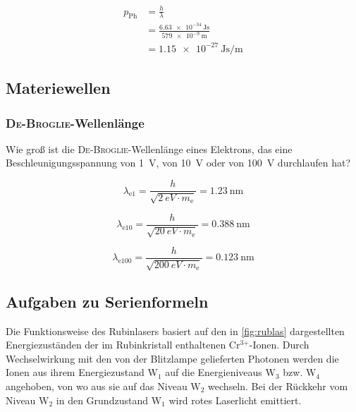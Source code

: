 \documentclass{ajc}
\begin{document}
	\begin{equation}
		\begin{split}
			p_\text{Ph} &= \frac{h}{\lambda} \\
						&= \frac{\SI{6,63e-34}{\J\s}}{\SI{579e-9}{\m}} \\
						&= \SI{1,15e-27}{\J\s\per\m}
		\end{split}
	\end{equation}
	
	\newpage
	
	\subsection{Materiewellen}
	
	\subsubsection{\textsc{D\lowercase{e}-B\lowercase{roglie}}-Wellenlänge}
	Wie groß ist die \textsc{De-Broglie}-Wellenlänge eines Elektrons, das eine Beschleunigungsspannung von \SI{1}{\volt}, von \SI{10}{\volt} oder von \SI{100}{\volt} durchlaufen hat?
	
	\begin{equation}
		\lambda_\text{e1} = \frac{h}{\sqrt{\SI{2}{eV} \cdot m_\text{e}}} = \SI{1,23}{\nm}
	\end{equation}
	
	\begin{equation}
		\lambda_\text{e10} = \frac{h}{\sqrt{\SI{20}{eV} \cdot m_\text{e}}} = \SI{0,388}{\nm}
	\end{equation}
	
	\begin{equation}
		\lambda_\text{e100} = \frac{h}{\sqrt{\SI{200}{eV} \cdot m_\text{e}}} = \SI{0,123}{\nm}
	\end{equation}
	
	\newpage

	\subsection{Aufgaben zu Serienformeln}
	Die Funktionsweise des Rubinlasers basiert auf den in \ref{fig:rublas} dargestellten Energiezuständen der im Rubinkristall enthaltenen Cr$^{\text{3+}}$-Ionen. Durch Wechselwirkung mit den von der Blitzlampe gelieferten Photonen werden die Ionen aus ihrem Energiezustand $\text{W}_1$ auf die Energieniveaus $\text{W}_3$ bzw. $\text{W}_4$ angehoben, von wo aus sie auf das Niveau $\text{W}_2$ wechseln. Bei der Rückkehr vom Niveau $\text{W}_2$ in den Grundzustand $\text{W}_1$ wird rotes Laserlicht emittiert.
	
\end{document}
